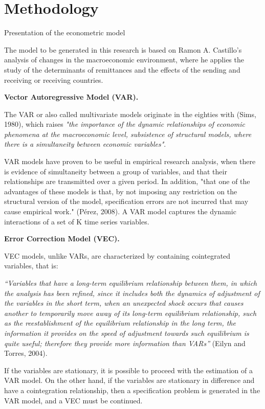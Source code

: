 \section{Methodology}
    
    \frame{\sectionpage}
    
    \begin{frame}{Presentation of the econometric model}
\par The model to be generated in this research is based on Ramon A. Castillo's analysis of changes in the macroeconomic environment, where he applies the study of the determinants of remittances and the effects of the sending and receiving or receiving countries.\par

\textbf{Vector Autoregressive Model (VAR).}\par
The VAR or also called multivariate models originate in the eighties with (Sims, 1980), which raises \textit{"the importance of the dynamic relationships of economic phenomena at the macroeconomic level, subsistence of structural models, where there is a simultaneity between economic variables"}.\par
VAR models have proven to be useful in empirical research analysis, when there is evidence of simultaneity between a group of variables, and that their relationships are transmitted over a given period. In addition, "that one of the advantages of these models is that, by not imposing any restriction on the structural version of the model, specification errors are not incurred that may cause empirical work." (Pérez, 2008). A VAR model captures the dynamic interactions of a set of K time series variables.\par

\textbf{Error Correction Model (VEC).}\par
VEC models, unlike VARs, are characterized by containing cointegrated variables, that is:\par
\textit{“Variables that have a long-term equilibrium relationship between them, in which the analysis has been refined, since it includes both the dynamics of adjustment of the variables in the short term, when an unexpected shock occurs that causes another to temporarily move away of its long-term equilibrium relationship, such as the reestablishment of the equilibrium relationship in the long term, the information it provides on the speed of adjustment towards such equilibrium is quite useful; therefore they provide more information than VARs”} (Eilyn and Torres, 2004).\par
If the variables are stationary, it is possible to proceed with the estimation of a VAR model. On the other hand, if the variables are stationary in difference and have a cointegration relationship, then a specification problem is generated in the VAR model, and a VEC must be continued.\par


\end{frame}

